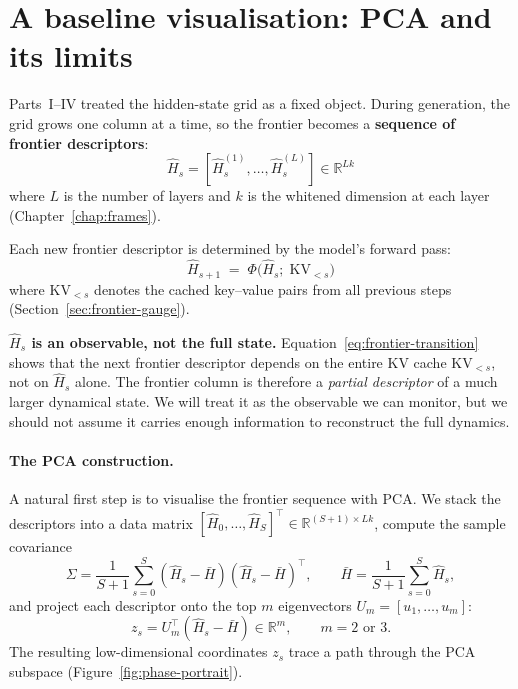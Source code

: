 \documentclass[11pt, twoside, openright]{memoir}
\numberwithin{equation}{chapter}
\begin{document}
\section{A baseline visualisation: PCA and its limits}
\label{sec:pred-dynamics}

Parts~I--IV treated the hidden-state grid as a fixed object.
During generation, the grid grows one column at a time, so the
frontier becomes a \textbf{sequence of frontier descriptors}:
\begin{equation}\label{eq:frontier-descriptor}
  \hat{H}_s = [\hat{H}^{(1)}_s, \ldots, \hat{H}^{(L)}_s]
  \in \mathbb{R}^{Lk}
\end{equation}
where $L$ is the number of layers and $k$ is the whitened dimension
at each layer (Chapter~\ref{chap:frames}).

Each new frontier descriptor is determined by the model's forward
pass:
\begin{equation}\label{eq:frontier-transition}
  \hat{H}_{s+1} \;=\; \Phi\!\bigl(\hat{H}_s;\;
    \mathrm{KV}_{<s}\bigr)
\end{equation}
where $\mathrm{KV}_{<s}$ denotes the cached key--value pairs from
all previous steps (Section~\ref{sec:frontier-gauge}).

\begin{pitfall}
\textbf{$\hat{H}_s$ is an observable, not the full state.}
Equation~\eqref{eq:frontier-transition} shows that the next frontier
descriptor depends on the entire KV cache $\mathrm{KV}_{<s}$, not on
$\hat{H}_s$ alone.  The frontier column is therefore a \emph{partial
descriptor} of a much larger dynamical state.  We will treat it as the
observable we can monitor, but we should not assume it carries enough
information to reconstruct the full dynamics.
\end{pitfall}

\paragraph{The PCA construction.}
A natural first step is to visualise the frontier sequence with PCA.
We stack the descriptors into a data matrix $[\hat{H}_0, \ldots,
\hat{H}_S]^\top \in \mathbb{R}^{(S+1)\times Lk}$, compute the
sample covariance
\begin{equation}\label{eq:pca-covariance}
  \Sigma = \frac{1}{S+1}\sum_{s=0}^{S}
    (\hat{H}_s - \bar{H})(\hat{H}_s - \bar{H})^\top,
  \qquad \bar{H} = \frac{1}{S+1}\sum_{s=0}^{S}\hat{H}_s,
\end{equation}
and project each descriptor onto the top $m$ eigenvectors
$U_m = [u_1, \ldots, u_m]$:
\begin{equation}\label{eq:pca-projection}
  z_s = U_m^\top(\hat{H}_s - \bar{H}) \in \mathbb{R}^m,
  \qquad m = 2 \text{ or } 3.
\end{equation}
The resulting low-dimensional coordinates $z_s$ trace a path through
the PCA subspace (Figure~\ref{fig:phase-portrait}).
\end{document}
